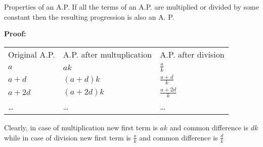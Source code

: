 \documentclass[aspectratio=1610,8pt]{beamer}
\begin{document}
\begin{frame}{Properties of an A.P.}
  If all the terms of an A.P. are multiplied or divided by some constant then
  the resulting progression is also an A. P.

  \textbf{Proof:}\\
  \begin{tabular}{lll}
    Original A.P.&A.P. after multuplication& A.P. after division\\
    $a$& $ak$ & $\frac{a}{k}$\\
    $a + d$ & $(a + d)k$ & $\frac{a + d}{k}$\\
    $a + 2d$ & $(a + 2d)k$ & $\frac{a + 2d}{k}$\\
    \ldots & \ldots & \ldots
  \end{tabular}

  Clearly, in case of multiplication new first term is $ak$ and common
  difference is $dk$ while in case of division new first term is $\frac{a}{k}$
  and common difference is $\frac{d}{k}$
\end{frame}
\end{document}
